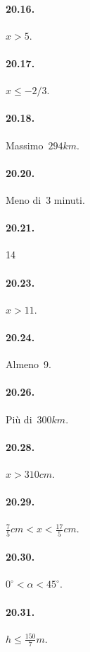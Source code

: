 \begin{multicols}{2}
\paragraph{20.16.} $x>5$.

\paragraph{20.17.} $x\le -2/3$.

\paragraph{20.18.} Massimo~$294\unit{km}$.

\paragraph{20.20.} Meno di~3 minuti.

\paragraph{20.21.} 14

\paragraph{20.23.} $x>11$.

\paragraph{20.24.} Almeno~9.

\paragraph{20.26.} Più di~$300\unit{km}$.

\paragraph{20.28.} $x>310\unit{cm}$.

\paragraph{20.29.} $\frac{7}{5}\unit{cm}<x<\frac{17}{5}\unit{cm}$.

\paragraph{20.30.} $0^{\circ}<\alpha<45^{\circ}$.

\paragraph{20.31.} $h\le \frac{150}{7}m$.
\end{multicols}

